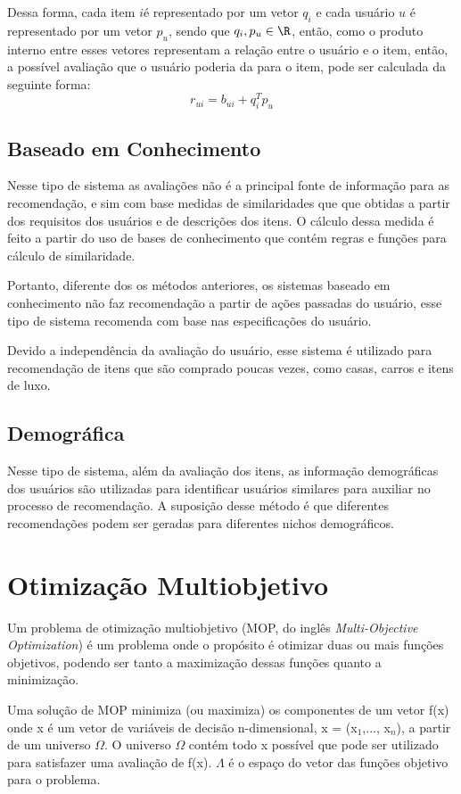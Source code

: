 Dessa forma, cada item \(i\)é representado por um vetor \(q_i\) e cada usuário \(u\) é representado por um vetor \(p_u\), sendo que \(q_i, p_u \in \R \), então, como o produto interno entre esses vetores representam a relação entre o usuário e o item, então, a possível avaliação que o usuário poderia da para o item, pode ser calculada  da seguinte forma:
\begin{equation}
    r_{ui} = b_{ui} + q_{i}^{T} p_u 
\end{equation}
\subsection{Baseado em Conhecimento}
Nesse tipo de sistema as avaliações não é a principal fonte de informação para as recomendação, e sim com base medidas de similaridades que que obtidas a partir dos requisitos dos usuários e de descrições dos itens. O cálculo dessa medida é feito a partir do uso de bases de conhecimento que contém regras e funções para cálculo de similaridade\cite{aggarwal2016recommender}. 

Portanto, diferente dos os métodos anteriores, os sistemas baseado em conhecimento não faz recomendação a partir de ações passadas do usuário, esse tipo de sistema recomenda com base nas especificações do usuário.

Devido a independência da avaliação do usuário, esse sistema é utilizado para recomendação de itens que são comprado poucas vezes, como casas, carros e itens de luxo.
\subsection{Demográfica}
Nesse tipo de sistema, além da avaliação dos itens, as informação demográficas dos usuários  são utilizadas para identificar usuários similares para auxiliar no processo de recomendação\cite{aggarwal2016recommender}. A suposição desse método é que diferentes recomendações podem ser geradas para diferentes nichos demográficos\cite{ricci2011introduction}.
\section{Otimização Multiobjetivo}
Um problema de otimização multiobjetivo (MOP, do inglês \textit{Multi-Objective Optimization}) é um problema onde  o propósito é otimizar duas ou mais funções objetivos, podendo ser tanto a maximização dessas funções quanto a minimização\cite{coello2007evolutionary}. 

Uma solução de MOP minimiza (ou maximiza) os componentes de um vetor f(x) onde x é um vetor de variáveis de decisão n-dimensional, x = (x$_{1}$,..., x$_{n}$), a partir de um universo $\Omega$. O universo $\Omega$ contém todo x possível que pode ser utilizado para satisfazer uma avaliação de f(x). $\Lambda$ é o espaço do vetor das funções objetivo para o problema.

